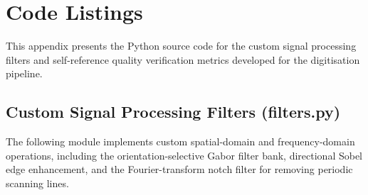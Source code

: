 \chapter{Code Listings}

This appendix presents the Python source code for the custom signal processing filters and self-reference quality verification metrics developed for the digitisation pipeline.

\section{Custom Signal Processing Filters (filters.py)}

The following module implements custom spatial-domain and frequency-domain operations, including the orientation-selective Gabor filter bank, directional Sobel edge enhancement, and the Fourier-transform notch filter for removing periodic scanning lines.

